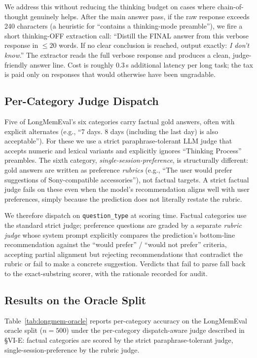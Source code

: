 \documentclass[conference]{IEEEtran}
\begin{document}
We address this without reducing the thinking budget on cases where chain-of-thought genuinely helps. After the main answer pass, if the raw response exceeds 240 characters (a heuristic for ``contains a thinking-mode preamble''), we fire a short thinking-OFF extraction call: ``Distill the FINAL answer from this verbose response in $\le 20$ words. If no clear conclusion is reached, output exactly: \textit{I don't know}.'' The extractor reads the full verbose response and produces a clean, judge-friendly answer line. Cost is roughly $0.3$\,s additional latency per long task; the tax is paid only on responses that would otherwise have been ungradable.

\subsection{Per-Category Judge Dispatch}
\label{subsec:judge}
Five of LongMemEval's six categories carry factual gold answers, often with explicit alternates (e.g., ``7 days. 8 days (including the last day) is also acceptable''). For these we use a strict paraphrase-tolerant LLM judge that accepts numeric and lexical variants and explicitly ignores ``Thinking Process'' preambles. The sixth category, \textit{single-session-preference}, is structurally different: gold answers are written as preference \textit{rubrics} (e.g., ``The user would prefer suggestions of Sony-compatible accessories''), not factual targets. A strict factual judge fails on these even when the model's recommendation aligns well with user preferences, simply because the prediction does not literally restate the rubric.

We therefore dispatch on \texttt{question\_type} at scoring time. Factual categories use the standard strict judge; preference questions are graded by a separate \textit{rubric judge} whose system prompt explicitly compares the prediction's bottom-line recommendation against the ``would prefer'' / ``would not prefer'' criteria, accepting partial alignment but rejecting recommendations that contradict the rubric or fail to make a concrete suggestion. Verdicts that fail to parse fall back to the exact-substring scorer, with the rationale recorded for audit.

\subsection{Results on the Oracle Split}
\label{subsec:oracle-results}
Table~\ref{tab:longmem-oracle} reports per-category accuracy on the LongMemEval oracle split ($n=500$) under the per-category dispatch-aware judge described in \S VI-E: factual categories are scored by the strict paraphrase-tolerant judge, single-session-preference by the rubric judge.
\end{document}
